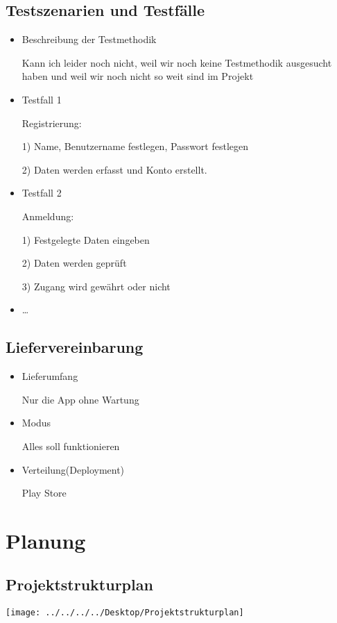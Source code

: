 \subsection{Testszenarien und Testfälle}
\begin{itemize}
	\item Beschreibung der Testmethodik
	
	Kann ich leider noch nicht, weil wir noch keine Testmethodik ausgesucht haben und weil wir noch nicht so weit sind im Projekt
	
	\item Testfall 1
	
	Registrierung:
	
	1) Name, Benutzername festlegen, Passwort festlegen
	
	2) Daten werden erfasst und Konto erstellt.
	
	\item Testfall 2
	
	Anmeldung:
	
	1) Festgelegte Daten eingeben
	
	2) Daten werden geprüft
	
	3) Zugang wird gewährt oder nicht
	
	\item \ldots
\end{itemize}
\subsection{Liefervereinbarung}
\begin{itemize}
	\item Lieferumfang
	
     Nur die App ohne Wartung 
	
	\item Modus
	
	Alles soll funktionieren
	
	
	\item Verteilung(Deployment)
	
	Play Store
	
\end{itemize}
\section{Planung}
\subsection{Projektstrukturplan}

\begin{center}
	\texttt{[image: ../../../../Desktop/Projektstrukturplan]}
\end{center}


